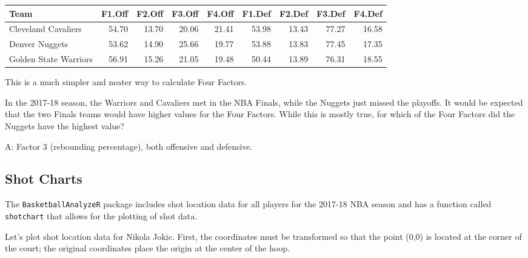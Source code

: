 \documentclass[
  11pt,
]{book}
\newenvironment{Shaded}{\begin{snugshade}}{\end{snugshade}}
\newcommand{\CommentTok}[1]{\textcolor[rgb]{0.56,0.35,0.01}{\textit{#1}}}
\newcommand{\DecValTok}[1]{\textcolor[rgb]{0.00,0.00,0.81}{#1}}
\newcommand{\FloatTok}[1]{\textcolor[rgb]{0.00,0.00,0.81}{#1}}
\newcommand{\FunctionTok}[1]{\textcolor[rgb]{0.00,0.00,0.00}{#1}}
\newcommand{\NormalTok}[1]{#1}
\newcommand{\OtherTok}[1]{\textcolor[rgb]{0.56,0.35,0.01}{#1}}
\newcommand{\SpecialCharTok}[1]{\textcolor[rgb]{0.00,0.00,0.00}{#1}}
\newcommand{\StringTok}[1]{\textcolor[rgb]{0.31,0.60,0.02}{#1}}
\theoremstyle{definition}
\theoremstyle{definition}
\theoremstyle{definition}
\theoremstyle{definition}
\theoremstyle{remark}
\begin{document}
\begin{table}[H]
\centering
\begin{tabular}{lrrrrrrrr}
\toprule
Team & F1.Off & F2.Off & F3.Off & F4.Off & F1.Def & F2.Def & F3.Def & F4.Def\\
\midrule
Cleveland Cavaliers & 54.70 & 13.70 & 20.06 & 21.41 & 53.98 & 13.43 & 77.27 & 16.58\\
Denver Nuggets & 53.62 & 14.90 & 25.66 & 19.77 & 53.88 & 13.83 & 77.45 & 17.35\\
Golden State Warriors & 56.91 & 15.26 & 21.05 & 19.48 & 50.44 & 13.89 & 76.31 & 18.55\\
\bottomrule
\end{tabular}
\end{table}

This is a much simpler and neater way to calculate Four Factors.

In the 2017-18 season, the Warriors and Cavaliers met in the NBA Finals, while the Nuggets just missed the playoffs. It would be expected that the two Finals teams would have higher values for the Four Factors. While this is mostly true, for which of the Four Factors did the Nuggets have the highest value?

A: Factor 3 (rebounding percentage), both offensive and defensive.

\hypertarget{shot-charts}{%
\subsection{Shot Charts}\label{shot-charts}}

The \texttt{BasketballAnalyzeR} package includes shot location data for all players for the 2017-18 NBA season and has a function called \texttt{shotchart} that allows for the plotting of shot data.

Let's plot shot location data for Nikola Jokic. First, the coordinates must be transformed so that the point (0,0) is located at the corner of the court; the original coordinates place the origin at the center of the hoop.

\begin{Shaded}
\end{Shaded}
\end{document}
